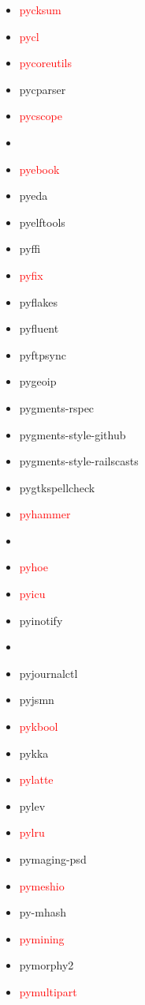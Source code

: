 \documentclass{l4proj}
\begin{document}
\begin{appendices}
{\begin{itemize}
\item\textcolor{red}{pycksum}
\item\textcolor{red}{pycl}
\item\textcolor{red}{pycoreutils}
\item pycparser
\item\textcolor{red}{pycscope}
\item {}
\item\textcolor{red}{pyebook}
\item pyeda
\item pyelftools
\item pyffi
\item\textcolor{red}{pyfix}
\item pyflakes
\item pyfluent
\item pyftpsync
\item pygeoip
\item pygments-rspec
\item pygments-style-github
\item pygments-style-railscasts
\item pygtkspellcheck
\item\textcolor{red}{pyhammer}
\item\textcolor{red}{}
\item\textcolor{red}{pyhoe}
\item\textcolor{red}{pyicu}
\item pyinotify
\item\textcolor{red}{}
\item pyjournalctl
\item pyjsmn
\end{itemize}
}%
\clearpage
\noindent\parbox[t]{0.32\textwidth}{\raggedright%
\begin{itemize}
\item\textcolor{red}{pykbool}
\item pykka
\item\textcolor{red}{pylatte}
\item pylev
\item\textcolor{red}{pylru}
\item pymaging-psd
\item\textcolor{red}{pymeshio}
\item py-mhash
\item\textcolor{red}{pymining}
\item pymorphy2
\item\textcolor{red}{pymultipart}

\end{itemize}}
\end{appendices}
\end{document}
